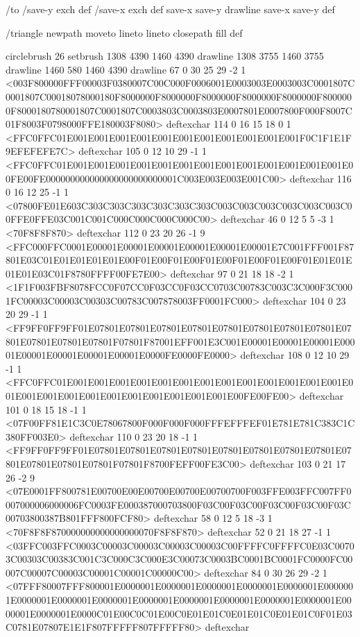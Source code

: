 /to
 { /save-y exch def
   /save-x exch def
   save-x save-y drawline
   save-x save-y } def

/triangle
 { newpath moveto lineto lineto closepath fill } def

circlebrush 26 setbrush
1308 4390 1460 4390 drawline
1308 3755 1460 3755 drawline
1460 580 1460 4390 drawline
67 0 30 25 29 -2 1 {{<003F800000FFF00003F0380007C00C000F0006001E0003003E0003003C0001807C0001807C00018078000180F8000000F8000000F8000000F8000000F8000000F8000000F8000180780001807C0001807C0003803C0003803E0007801E0007800F000F8007C01F8003F0798000FFE180003F8080>}} deftexchar
114 0 16 15 18 0 1 {{<FFC0FFC01E001E001E001E001E001E001E001E001E001E001E001F0C1F1E1F9EFEFEFE7C>}} deftexchar
105 0 12 10 29 -1 1 {{<FFC0FFC01E001E001E001E001E001E001E001E001E001E001E001E001E001E00FE00FE000000000000000000000000001C003E003E003E001C00>}} deftexchar
116 0 16 12 25 -1 1 {{<07800FE01E603C303C303C303C303C303C303C003C003C003C003C003C003C00FFE0FFE03C001C001C000C000C000C000C00>}} deftexchar
46 0 12 5 5 -3 1 {{<70F8F8F870>}} deftexchar
112 0 23 20 26 -1 9 {{<FFC000FFC0001E00001E00001E00001E00001E00001E00001E7C001FFF001F87801E03C01E01E01E01E01E00F01E00F01E00F01E00F01E00F01E00F01E01E01E01E01E03C01F8780FFFF00FE7E00>}} deftexchar
97 0 21 18 18 -2 1 {{<1F1F003FBF8078FCC0F07CC0F03CC0F03CC0703C00783C003C3C000F3C0001FC00003C00003C00303C00783C007878003FF0001FC000>}} deftexchar
104 0 23 20 29 -1 1 {{<FF9FF0FF9FF01E07801E07801E07801E07801E07801E07801E07801E07801E07801E07801E07801E07801F07801F87001EFF001E3C001E00001E00001E00001E00001E00001E00001E00001E00001E0000FE0000FE0000>}} deftexchar
108 0 12 10 29 -1 1 {{<FFC0FFC01E001E001E001E001E001E001E001E001E001E001E001E001E001E001E001E001E001E001E001E001E001E001E001E001E00FE00FE00>}} deftexchar
101 0 18 15 18 -1 1 {{<07F00FF81E1C3C0E78067800F000F000F000FFFEFFFEF01E781E781C383C1C380FF003E0>}} deftexchar
110 0 23 20 18 -1 1 {{<FF9FF0FF9FF01E07801E07801E07801E07801E07801E07801E07801E07801E07801E07801E07801E07801F07801F8700FEFF00FE3C00>}} deftexchar
103 0 21 17 26 -2 9 {{<07E0001FF800781E00700E00E00700E00700E00700700F003FFE003FFC007FF0007000006000006FC0003FE000387000703800F03C00F03C00F03C00F03C00F03C00703800387B801FFF800FCF80>}} deftexchar
58 0 12 5 18 -3 1 {{<70F8F8F870000000000000000070F8F8F870>}} deftexchar
52 0 21 18 27 -1 1 {{<03FFC003FFC0003C00003C00003C00003C00003C00FFFFC0FFFFC0E03C00703C00303C00383C001C3C000C3C000E3C00073C0003BC0001BC0001FC0000FC00007C00007C00003C00001C00001C00000C00>}} deftexchar
84 0 30 26 29 -2 1 {{<07FFF80007FFF800001E0000001E0000001E0000001E0000001E0000001E0000001E0000001E0000001E0000001E0000001E0000001E0000001E0000001E0000001E0000001E0000001E0000C01E00C0C01E00C0E01E01C0E01E01C0E01E01C0F01E03C0781E07807E1E1F807FFFFF807FFFFF80>}} deftexchar
